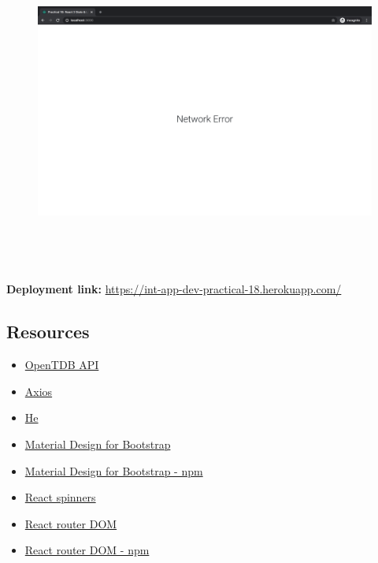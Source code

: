 \documentclass{article}
\begin{document}
\begin{figure}[H]
  \includegraphics[width=175mm, height=105mm]{./img/18-expected-opentdb-5.png}
\end{figure}

\textbf{Deployment link:} \href{https://int-app-dev-practical-18.herokuapp.com/}{https://int-app-dev-practical-18.herokuapp.com/} 

\subsection*{Resources} 
\begin{itemize}
  \item \href{https://opentdb.com/}{OpenTDB API}
  \item \href{https://www.npmjs.com/package/axios/}{Axios}
  \item \href{https://www.npmjs.com/package/he/}{He}
  \item \href{https://mdbootstrap.com/}{Material Design for Bootstrap}
  \item \href{https://www.npmjs.com/package/mdbreact/}{Material Design for Bootstrap - npm}
  \item \href{https://www.npmjs.com/package/react-spinners/}{React spinners}
  \item \href{https://reactrouter.com/web/guides/quick-start/}{React router DOM}
  \item \href{https://www.npmjs.com/package/react-router-dom/}{React router DOM - npm}
\end{itemize}
 
\end{document}

